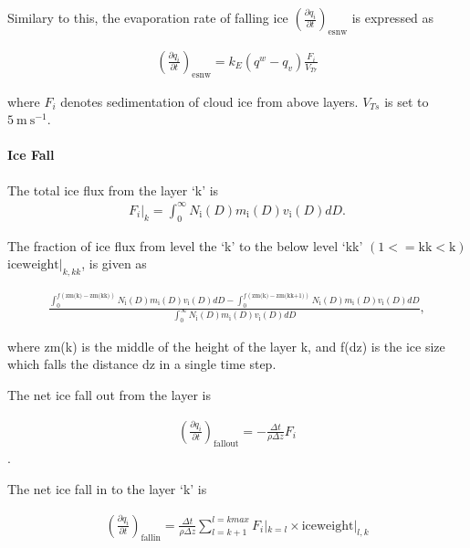 Similary to this, the evaporation rate of falling ice
\(\left(\frac{\partial q_i}{\partial t}\right)_{\text {esnw}}\) is
expressed as

\begin{eqnarray}
\left(\frac{\partial q_i}{\partial t}\right)_{\text {esnw}}
=k_{E}\left(q^{w}-q_v\right) \frac{F_i}{V_{Tr}}
\end{eqnarray}

where \(F_i\) denotes sedimentation of cloud ice from above layers.
\(V_{Ts}\) is set to \(5\mathrm{~m} \mathrm{~s}^{-1}\).

\hypertarget{ice-fall}{%
\paragraph{Ice Fall}\label{ice-fall}}

The total ice flux from the layer `k' is \begin{eqnarray}
F_i|_k = \int^\infty_0 N_{\mathrm{i}}(D) m_{\mathrm{i}}(D) v_{\text {i}}(D)dD.
\end{eqnarray}

The fraction of ice flux from level the `k' to the below level `kk'
\((1<=\text{kk}<\text{k})\) \(\text{iceweight}|_{k,kk}\), is given as

\begin{eqnarray}
\frac{\int^{f(\text{zm(k)}-\text{zm(kk)})}_0 N_{\mathrm{i}}(D) m_{\mathrm{i}}(D) v_{\text {i}}(D)dD-
\int^{f(\text{zm(k)}-\text{zm(kk+1)})}_0 N_{\mathrm{i}}(D) m_{\mathrm{i}}(D) v_{\text {i}}(D)dD}
{\int^\infty_0 N_{\mathrm{i}}(D) m_{\mathrm{i}}(D) v_{\text {i}}(D)dD},
\end{eqnarray}

where zm(k) is the middle of the height of the layer k, and f(dz) is the
ice size which falls the distance dz in a single time step.

The net ice fall out from the layer is

\begin{eqnarray}
\left(\frac{\partial q_i}{\partial t}\right)_{\text {fallout}}
=-\frac{\Delta t}{\rho \Delta z}F_i
\end{eqnarray}.

The net ice fall in to the layer `k' is

\begin{eqnarray}
\left(\frac{\partial q_i}{\partial t}\right)_{\text {fallin}}
=\frac{\Delta t}{\rho \Delta z} \sum^{l=kmax}_{l=k+1}F_i|_{k=l} \times \text{iceweight}|_{l,k}
\end{eqnarray}

